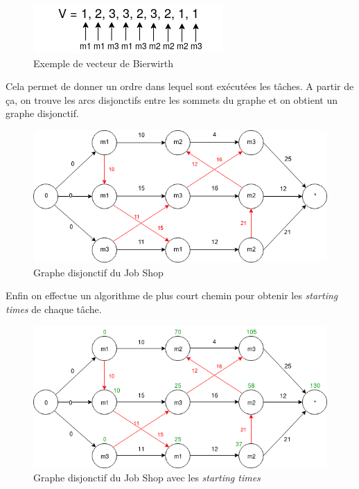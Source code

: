 \documentclass{article}
\begin{document}
\begin{figure}[!ht]
  \caption{Exemple de vecteur de Bierwirth}
  \label{Vecteur de Bierwirth}
  \centering
  \includegraphics[scale=0.75]{images/OAD_vecteur_bierwirth.png}
\end{figure}

Cela permet de donner un ordre dans lequel sont exécutées les
tâches. A partir de ça, on trouve les arcs disjonctifs entre les
sommets du graphe et on obtient un graphe disjonctif.

\begin{figure}[!ht]
  \caption{Graphe disjonctif du Job Shop}
  \label{Graphe disjonctif}
  \centering
  \includegraphics[scale=0.5]{images/OAD_grapheJS_disonctif.png}
\end{figure}

\newpage

Enfin on effectue un algorithme de plus court chemin pour obtenir les \emph{starting times}
de chaque tâche.

\begin{figure}[!ht]
  \caption{Graphe disjonctif du Job Shop avec les \emph{starting times}}
  \label{Graphe disjonctif avec starting times}
  \centering
  \includegraphics[scale=0.5]{images/OAD_grapheJS_disjonctif_pcc.png}
\end{figure}
\end{document}
